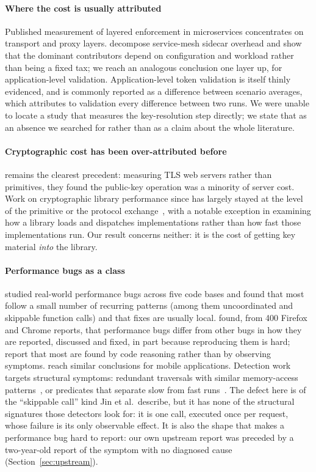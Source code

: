 \documentclass[preprint,12pt,authoryear]{elsarticle}
\begin{document}
\paragraph{Where the cost is usually attributed} Published measurement of
layered enforcement in microservices concentrates on transport and proxy
layers. \citet{zhu2023dissecting} decompose service-mesh sidecar
overhead and show that the dominant contributors depend on configuration and
workload rather than being a fixed tax; we reach an analogous conclusion one
layer up, for application-level validation. Application-level token validation
is itself thinly evidenced, and is commonly reported as a difference between
scenario averages, which attributes to validation every difference between two
runs. We were unable to locate a study that measures the key-resolution step
directly;
we state that as an absence we searched for rather than as a claim about the
whole literature.

\paragraph{Cryptographic cost has been over-attributed before} \citet{coarfa2006performance} remains the clearest precedent: measuring TLS
web servers rather than primitives, they found the public-key operation was a
minority of server cost. Work on cryptographic library performance since has
largely stayed at the level of the primitive or the protocol
exchange~\citep{naser2020performance,sikeridis2020assessing}, with \citet{tuveri2019engines} a notable exception in examining how a library
loads and dispatches implementations rather than how fast those
implementations run. Our result concerns neither: it is the cost of getting key
material \emph{into} the library.

\paragraph{Performance bugs as a class} \citet{jin2012understanding} studied real-world performance bugs across five
code bases and found that most follow a small number of recurring patterns (among them uncoordinated and skippable function calls) and that fixes are
usually local. \citet{zaman2012qualitative} found, from 400
Firefox and Chrome reports, that performance bugs differ from other bugs in
how they are reported, discussed and fixed, in part because reproducing them
is hard; \citet{nistor2013discovering} report that most are found
by code reasoning rather than by observing symptoms. \citet{liu2014characterizing} reach similar conclusions for mobile
applications. Detection work targets structural symptoms: redundant traversals
with similar memory-access patterns~\citep{nistor2013toddler}, or predicates
that separate slow from fast runs~\citep{song2014statistical}. The defect here
is of the ``skippable call'' kind Jin et al.\ describe, but it has none of the
structural signatures those detectors look for: it is one call, executed once
per request, whose failure is its only observable effect. It is also the shape
that makes a performance bug hard to report: our own upstream report was
preceded by a two-year-old report of the symptom with no diagnosed cause
(Section~\ref{sec:upstream}).
\end{document}
